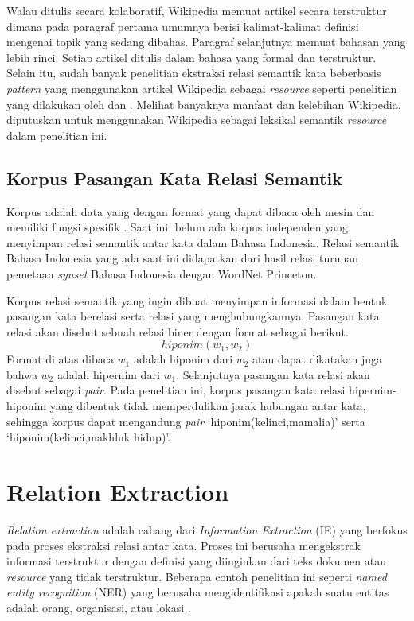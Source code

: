 Walau ditulis secara kolaboratif, Wikipedia memuat artikel secara terstruktur dimana pada paragraf pertama umumnya berisi kalimat-kalimat definisi mengenai topik yang sedang dibahas. Paragraf selanjutnya memuat bahasan yang lebih rinci. Setiap artikel ditulis dalam bahasa yang formal dan terstruktur. Selain itu, sudah banyak penelitian ekstraksi relasi semantik kata beberbasis \textit{pattern} yang menggunakan artikel Wikipedia sebagai \textit{resource} seperti penelitian yang dilakukan oleh \cite{ruiz2005automatic} dan \cite{arnold2014extracting}. Melihat banyaknya manfaat dan kelebihan Wikipedia, diputuskan untuk menggunakan Wikipedia sebagai leksikal semantik \textit{resource} dalam penelitian ini. 


\subsection{Korpus Pasangan Kata Relasi Semantik}
Korpus adalah data yang dengan format yang dapat dibaca oleh mesin dan memiliki fungsi spesifik \citep{atkins1992corpus}. Saat ini, belum ada korpus independen yang menyimpan relasi semantik antar kata dalam Bahasa Indonesia. Relasi semantik Bahasa Indonesia yang ada saat ini didapatkan dari hasil relasi turunan pemetaan \textit{synset} Bahasa Indonesia dengan WordNet Princeton. 

Korpus relasi semantik yang ingin dibuat menyimpan informasi dalam bentuk pasangan kata berelasi serta relasi yang menghubungkannya. Pasangan kata relasi akan disebut sebuah relasi biner dengan format sebagai berikut.
\[ hiponim(w_1,w_2) \]
\noindent Format di atas dibaca $w_1$ adalah hiponim dari $w_2$ atau dapat dikatakan juga bahwa $w_2$ adalah hipernim dari $w_1$. Selanjutnya pasangan kata relasi akan disebut sebagai \textit{pair}. Pada penelitian ini, korpus pasangan kata relasi hipernim-hiponim yang dibentuk tidak memperdulikan jarak hubungan antar kata, sehingga korpus dapat mengandung \textit{pair} `hiponim(kelinci,mamalia)' serta `hiponim(kelinci,makhluk hidup)'.


\section{Relation Extraction}
\textit{Relation extraction} adalah cabang dari \textit{Information Extraction} (IE) yang berfokus pada proses ekstraksi relasi antar kata. Proses ini berusaha mengekstrak informasi terstruktur dengan definisi yang diinginkan dari teks dokumen atau \textit{resource} yang tidak terstruktur. Beberapa contoh penelitian ini seperti \textit{named entity recognition} (NER) yang berusaha mengidentifikasi apakah suatu entitas adalah orang, organisasi, atau lokasi \citep{bikel1999algorithm}. 

